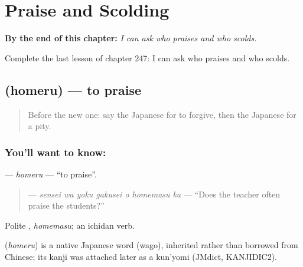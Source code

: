 
\chapter{Praise and Scolding}
\label{ch:ja-praise-and-scolding}

\begin{chapteropening}
\textbf{By the end of this chapter:} \emph{I can ask who praises and who scolds.}

Complete the last lesson of chapter 247: I can ask who praises and who scolds.
\end{chapteropening}

\section[\texorpdfstring{\ja{ほめる} (homeru)}{ほめる (homeru)}]{ (homeru) — to praise}

\label{lesson:JA-C247-homeru}



\begin{quote}
Before the new one: say the Japanese for to forgive, then the Japanese for a pity.
\end{quote}

\subsection*{You'll want to know: }
\textbf{} — \emph{homeru} — \textquotedblleft{}to praise\textquotedblright{}.

\begin{quote}
\textbf{   } — \emph{sensei wa yoku gakusei o homemasu ka} — \textquotedblleft{}Does the teacher often praise the students?\textquotedblright{}
\end{quote}

Polite \textbf{}, \emph{homemasu}; an ichidan verb.

\begin{cousinweb}
\textbf{} (\emph{homeru}) is a native Japanese word (wago), inherited rather than borrowed from Chinese; its kanji was attached later as a kun'yomi (JMdict, KANJIDIC2).
\end{cousinweb}

